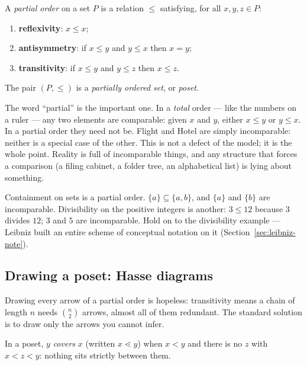 \begin{definition}
A \emph{partial order} on a set $P$ is a relation $\leq$ satisfying, for all
$x, y, z \in P$:
\begin{enumerate}[label=(\roman*),leftmargin=2.2em]
\item \textbf{reflexivity}: $x \leq x$;
\item \textbf{antisymmetry}: if $x \leq y$ and $y \leq x$ then $x = y$;
\item \textbf{transitivity}: if $x \leq y$ and $y \leq z$ then $x \leq z$.
\end{enumerate}
The pair $(P, \leq)$ is a \emph{partially ordered set}, or \emph{poset}.
\end{definition}

The word ``partial'' is the important one. In a \emph{total} order --- like
the numbers on a ruler --- any two elements are comparable: given $x$ and $y$,
either $x \leq y$ or $y \leq x$. In a partial order they need not be.
\textsf{Flight} and \textsf{Hotel} are simply incomparable: neither is a
special case of the other. This is not a defect of the model; it is the whole
point. Reality is full of incomparable things, and any structure that forces a
comparison (a filing cabinet, a folder tree, an alphabetical list) is lying
about something.

\begin{example}
Containment on sets is a partial order. $\{a\} \subseteq \{a,b\}$, and
$\{a\}$ and $\{b\}$ are incomparable. Divisibility on the positive integers is
another: $3 \leq 12$ because $3$ divides $12$; $3$ and $5$ are incomparable.
Hold on to the divisibility example --- Leibniz built an entire scheme of
conceptual notation on it (Section~\ref{sec:leibniz-note}).
\end{example}

\subsection{Drawing a poset: Hasse diagrams}

Drawing every arrow of a partial order is hopeless: transitivity means a chain
of length $n$ needs $\binom{n}{2}$ arrows, almost all of them redundant. The
standard solution is to draw only the arrows you cannot infer.

\begin{definition}[Cover]
In a poset, $y$ \emph{covers} $x$ (written $x \lessdot y$) when $x < y$ and
there is no $z$ with $x < z < y$: nothing sits strictly between them.
\end{definition}

